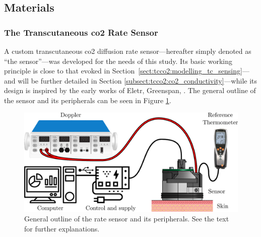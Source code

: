 \subsection{Materials}\label{sect:tcco2:materials}

\subsubsection{The Transcutaneous \texorpdfstring{\gls{co2}}{CO2} Rate Sensor}\label{subsect:tcco2:mat_sensor}

A custom transcutaneous \gls{co2} diffusion rate sensor---hereafter simply denoted as \enquote{the sensor}---was developed for the needs of this study. Its basic working principle is close to that evoked in Section~\ref{sect:tcco2:modelling_tc_sensing}---and will be further detailed in Section \ref{subsect:tcco2:co2_conductivity}---while its design is inspired by the early works of Eletr, Greenspan, \etal{}\cite{eletr1978, greenspan1981}. The general outline of the sensor and its peripherals can be seen in Figure \ref{fig:tcco2:global_schematic}.

\begin{figure}
	\centering
	\includegraphics[width=\linewidth]{1_main_matter/tcco2_figures//global_schematic.pdf}
	\caption[General outline of the rate sensor and its peripherals.]{General outline of the rate sensor and its peripherals. See the text for further explanations.}\label{fig:tcco2:global_schematic}
\end{figure}

